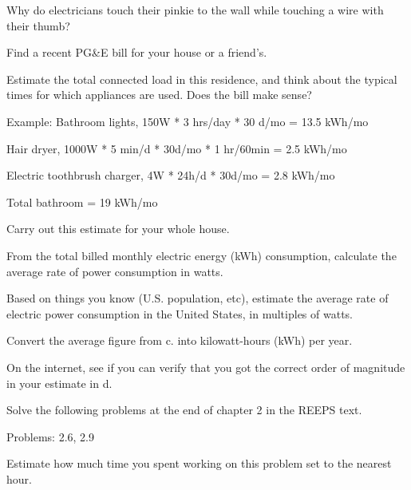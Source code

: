 \documentclass{article}
\begin{document}
\subproblem
Why do electricians touch their pinkie to the wall while touching
a wire with their thumb?


Find a recent PG\&E bill for your house or a friend's.

\subproblem
Estimate the total connected load in this residence, and think
about the typical times for which appliances are used.  Does the
bill make sense?

Example: Bathroom lights, 150W * 3 hrs/day * 30 d/mo = 13.5 kWh/mo

Hair dryer, 1000W * 5 min/d * 30d/mo * 1 hr/60min = 2.5 kWh/mo

Electric toothbrush charger, 4W * 24h/d * 30d/mo = 2.8 kWh/mo

Total bathroom = 19 kWh/mo

Carry out this estimate for your whole house.

\subproblem
From the total billed monthly electric energy (kWh) consumption,
calculate the average rate of power consumption in watts.

\subproblem
Based on things you know (U.S. population, etc), estimate the
average rate of electric power consumption in the United States, in
multiples of watts.

\subproblem
Convert the average figure from c. into kilowatt-hours (kWh) per year.

\subproblem
On the internet, see if you can verify that you got the correct
order of magnitude in your estimate in d.



Solve the following problems at the end of chapter 2 in the REEPS text.

Problems:  2.6, 2.9


Estimate how much time you spent working on this problem set to the
nearest hour.
\end{document}
